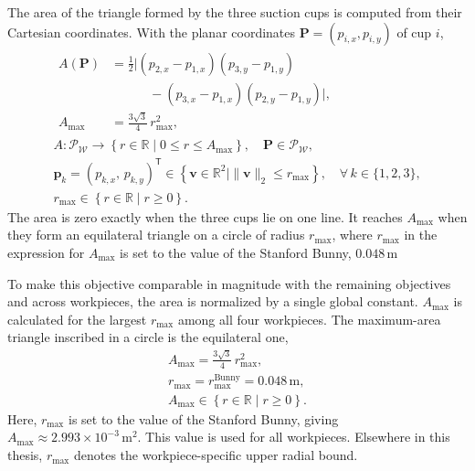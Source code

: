     The area of the triangle formed by the three suction cups is computed from their Cartesian
    coordinates. With the planar coordinates $ \mathbf{P} = (p_{i,x},p_{i,y})$ of cup $i$,
    \begin{equation}
        \label{eq:cup_triangle_area}
        \begin{gathered}
            \begin{aligned}
                A(\mathbf{P})
                &=
                \frac{1}{2}
                \bigl|
                    (p_{2,x} - p_{1,x})(p_{3,y} - p_{1,y})
                \\
                &\qquad\quad
                    - (p_{3,x} - p_{1,x})(p_{2,y} - p_{1,y})
                \bigr|,
                \\[3pt]
                A_{\max}
                &=
                \tfrac{3\sqrt{3}}{4}\, r_{\max}^{2},
            \end{aligned}
            \\[4pt]
            A : \mathcal{P}_{\mathcal{W}} \rightarrow
            \left\{ r \in \mathbb{R} \mid 0 \le r \le A_{\max} \right\},
            \quad
            \mathbf{P} \in \mathcal{P}_{\mathcal{W}},
            \\[2pt]
            \mathbf{p}_{k} = (p_{k,x},\, p_{k,y})^{\mathsf{T}}
            \in \left\{ \mathbf{v} \in \mathbb{R}^{2} \mid \|\mathbf{v}\|_{2} \le r_{\max} \right\},
            \quad
            \forall\, k \in \{1,2,3\},
            \\[2pt]
            r_{\max} \in \left\{ r \in \mathbb{R} \mid r \ge 0 \right\}.
        \end{gathered}
    \end{equation}
The area is zero exactly when the three cups lie on one line. It reaches
$A_{\max}$ when they form an equilateral triangle on a circle of radius
$r_{\max}$, where $r_{\max}$ in the expression for $A_{\max}$ is set to the
value of the Stanford Bunny, $0.048\,\mathrm{m}$ 

    To make this objective comparable in magnitude with the remaining objectives and
    across workpieces, the area is normalized by a single global constant. $A_{\max}$ is calculated
    for the largest $r_{\max}$ among all four workpieces. The maximum-area
    triangle inscribed in a circle is the equilateral one, 
    \begin{equation}
        \label{eq:cup_area_max}
        \begin{gathered}
            A_{\max} = \frac{3\sqrt{3}}{4}\, r_{\max}^{2},
            \\[4pt]
            r_{\max} = r_{\max}^{\text{Bunny}} = 0.048\,\mathrm{m},
            \\[2pt]
            A_{\max} \in \left\{ r \in \mathbb{R} \mid r \ge 0 \right\}.
        \end{gathered}
    \end{equation}
    Here, $r_{\max}$ is set to the value of the Stanford Bunny, giving
    $A_{\max}\approx 2.993\times10^{-3}\,\mathrm{m^2}$. This value is used for all
    workpieces. Elsewhere in this thesis, $r_{\max}$ denotes the workpiece-specific
    upper radial bound.

